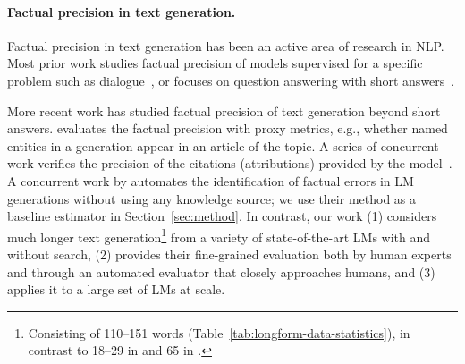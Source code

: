 \paragraph{Factual precision in text generation.}

Factual precision in text generation %
has been an active area of research in NLP. 
Most prior work studies factual precision of models supervised for a specific problem such as dialogue~\citep{shuster2021retrieval}, or focuses on question answering with short answers~\citep{kadavath2022language,kandpal2022large,mallen2022not,nori2023capabilities}.

More recent work has studied factual precision of text generation beyond short answers. 
\citet{lee2022factuality} evaluates the factual precision with proxy metrics, e.g., whether named entities in a generation appear in an article of the topic.
A series of concurrent work verifies the precision of the citations (attributions) provided by the model~\citep{gao2022attributed,liu2023evaluating,yue2023automatic,gao2023enabling}.
A concurrent work by \citet{manakul2023selfcheckgpt} automates the identification of factual errors in LM generations without using any knowledge source; we use their method as a baseline estimator in Section~\ref{sec:method}.
In contrast, our work (1) considers much longer text generation\footnote{Consisting of 110--151 words (Table~\ref{tab:longform-data-statistics}), in contrast to 18--29 in \citet{gao2022attributed} and 65 in \citet{liu2023evaluating}.} from a variety of state-of-the-art LMs with and without search, (2) provides their fine-grained evaluation both by human experts and through an automated evaluator that closely approaches humans, and (3) applies it to a large set of LMs at scale.



